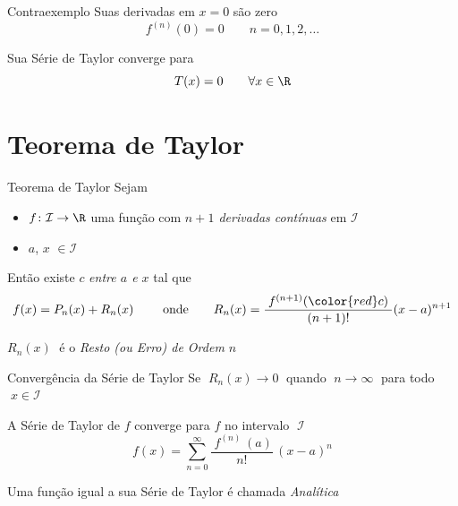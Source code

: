 \documentclass[fleqn,utf8,aspectratio=169,12pt]{beamer}
\begin{document}
\begin{frame}{Contraexemplo}
  Suas derivadas em \(x=0\) são zero
  \[
    f^{(n)}(0) = 0 \qquad n = 0, 1, 2, \dots
  \]

  \pause
  \vspace{\baselineskip}
  Sua Série de Taylor converge para
  \[
    T(x) = 0 \qquad \forall x \in \R
  \]
\end{frame}

\section{Teorema de Taylor}

\begin{frame}{Teorema de Taylor}
  Sejam
  \begin{itemize}
  \item \(f\colon\mathcal{I}\rightarrow \R\) uma função com \emph{$n+1$
        derivadas contínuas} em $\mathcal{I}$
  \item $a$, $x$ $\in\mathcal{I}$
  \end{itemize}

  \pause
  \vspace{\baselineskip}
  Então existe {\color{red}\(c\)} \emph{entre \(a\) e \(x\)} \pause tal que
  \[
    f(x)=P_n(x)+R_n(x)\
    \qquad \text{onde} \qquad
    R_n(x)=\frac{\;f^{(n+1)}({\color{red}c})\;}{(n+1)!}(x-a)^{n+1}
  \]

  \vspace{.5\baselineskip}
  $R_n(x)\;$ é o \emph{Resto (ou Erro) de Ordem $n$}
\end{frame}

\begin{frame}{Convergência da Série de Taylor}
Se \emph{\(\;R_n(x)\to 0\;\)} quando \emph{\(\;n\to\infty\;\)}
para todo \(\;x\in\mathcal{I}\;\)

\pause
\vspace{\baselineskip}
A Série de Taylor de $f$ converge para $f$ no intervalo \(\;\mathcal{I}\;\)
\[
  f(x) = \sum_{n=0}^\infty \frac{\;f^{(n)\;}(a)}{n!}\,(x-a)^n
\]

\pause
Uma função igual a sua Série de Taylor é chamada \emph{Analítica}
\end{frame}
\end{document}
